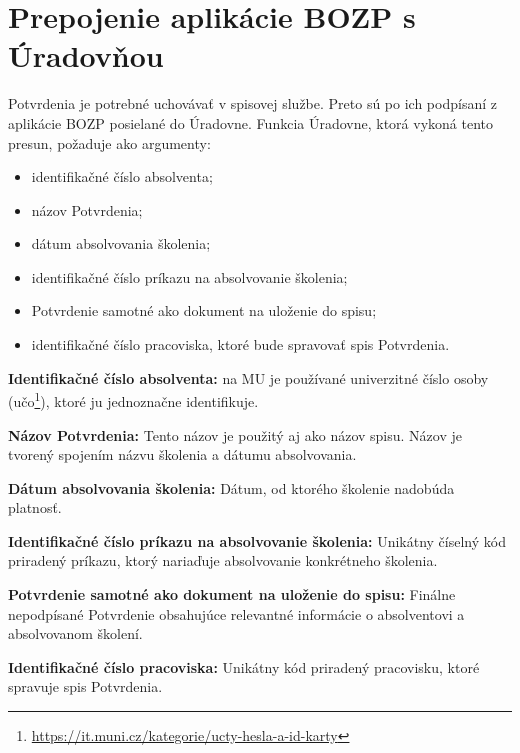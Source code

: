 \documentclass[
  digital,     %
  oneside,     %
  nosansbold,  %
  nocolorbold, %
  lof,         %
  nolot,         %
]{fithesis4}
\begin{document}
\section{Prepojenie aplikácie BOZP s Úradovňou}
Potvrdenia je potrebné uchovávať v spisovej službe. Preto sú po ich podpísaní z aplikácie BOZP posielané do Úradovne. Funkcia Úradovne, ktorá vykoná tento presun, požaduje ako argumenty:

\begin{itemize}
    \item identifikačné číslo absolventa;
    \item názov Potvrdenia;
    \item dátum absolvovania školenia;
    \item identifikačné číslo príkazu na absolvovanie školenia;
    \item Potvrdenie samotné ako dokument na uloženie do spisu;
    \item identifikačné číslo pracoviska, ktoré bude spravovať spis Potvrdenia.
\end{itemize}
\noindent
\textbf{Identifikačné číslo absolventa:} na MU je používané univerzitné číslo osoby (učo\footnote{\url{https://it.muni.cz/kategorie/ucty-hesla-a-id-karty}}), ktoré ju jednoznačne identifikuje.

\noindent
\textbf{Názov Potvrdenia:} Tento názov je použitý aj ako názov spisu. Názov je tvorený spojením názvu školenia a dátumu absolvovania.

\noindent
\textbf{Dátum absolvovania školenia:} Dátum, od ktorého školenie nadobúda platnosť.

\noindent
\textbf{Identifikačné číslo príkazu na absolvovanie školenia:} Unikátny číselný kód priradený príkazu, ktorý nariaďuje absolvovanie konkrétneho školenia.

\noindent
\textbf{Potvrdenie samotné ako dokument na uloženie do spisu:} Finálne nepodpísané Potvrdenie obsahujúce relevantné informácie o absolventovi a absolvovanom školení.

\noindent
\textbf{Identifikačné číslo pracoviska:} Unikátny kód priradený pracovisku, ktoré spravuje spis Potvrdenia.
\end{document}
